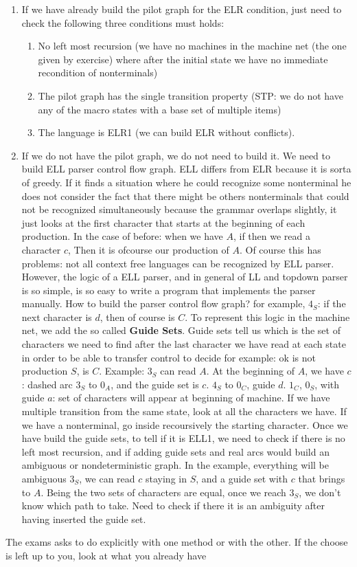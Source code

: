 			\begin{enumerate}
				\item If we have already build the pilot graph for the ELR condition, just need to check the following three conditions must holds:
				\begin{enumerate}
					\item No left most recursion (we have no machines in the machine net (the one given by exercise) where after the initial state we have no immediate recondition of nonterminals)
					\item The pilot graph has the single transition property (STP: we do not have any of the macro states with a base set of multiple items)
					\item The language is ELR1 (we can build ELR without conflicts).
				\end{enumerate}
				\item If we do not have the pilot graph, we do not need to build it. We need to build ELL parser control flow graph. ELL differs from ELR because it is sorta of greedy.
				If it finds a situation where he could recognize some nonterminal he does not consider the fact that there might be others nonterminals that could not be recognized simultaneously 
				because the grammar overlaps slightly, it just looks at the first character that starts at the beginning of each production. In the case of before: when we have $A$, if then we read a character $c$,
				Then it is ofcourse our production of $A$. Of course this has problems: not all context free languages can be recognized by ELL parser. However, the logic of a ELL parser, and in general of 
				LL and topdown parser is so simple, is so easy to write a program that implements the parser manually. How to build the parser control flow graph? for example, $4_S$: if the next 
				character is $d$, then of course is $C$. To represent this logic in the machine net, we add the so called \textbf{Guide Sets}. Guide sets tell us which is the set of characters 
				we need to find after the last character we have read at each state in order to be able to transfer control to decide for example: ok is not production $S$, is $C$. Example: $3_S$ can read $A$.
				At the beginning of $A$, we have $c$: dashed arc $3_S$ to $0_A$, and the guide set is $c$. $4_S$ to $0_C$, guide $d$. $1_C$, $0_S$, with guide $a$: set of characters will appear at 
				beginning of machine. If we have multiple transition from the same state, look at all the characters we have. If we have a nonterminal, go inside recoursively the starting character.
				Once we have build the guide sets, to tell if it is ELL1, we need to check if there is no left most recursion, and if adding guide sets and real arcs would build an ambiguous or nondeterministic 
				graph. In the example, everything will be ambiguous $3_S$, we can read $c$ staying in $S$, and a guide set with $c$ that brings to $A$. Being the two sets of characters are equal, once we reach $3_S$, 
				we don't know which path to take. Need to check if there it is an ambiguity after having inserted the guide set.
			\end{enumerate}
			The exams asks to do explicitly with one method or with the other. If the choose is left up to you, look at what you already have %
